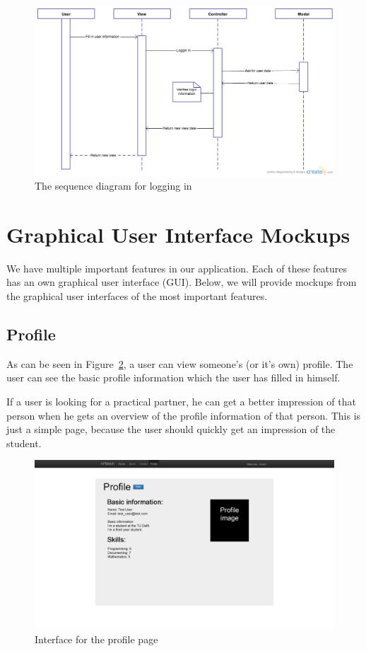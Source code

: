 \begin{figure}[H]
    \centering
    \captionsetup{justification=centering}
    \includegraphics[width=\textwidth, frame]{images/sequence_login}
    \caption{The sequence diagram for logging in}
    \label{sequence_login}
\end{figure}

\section{Graphical User Interface Mockups}
We have multiple important features in our application.
Each of these features has an own graphical user interface (GUI).
Below, we will provide mockups from the graphical user interfaces of the most important features.

\subsection{Profile}
As can be seen in Figure~\ref{mockup_profile}, a user can view someone's (or it's own) profile.
The user can see the basic profile information which the user has filled in himself.

If a user is looking for a practical partner, he can get a better impression of that person when he gets an overview of the profile information of that person.
This is just a simple page, because the user should quickly get an impression of the student.\\

\begin{figure}[H]
    \centering
    \captionsetup{justification=centering}
    \includegraphics[width=\textwidth, frame]{images/mockup_profile}
    \caption{Interface for the profile page}
    \label{mockup_profile}
\end{figure}

